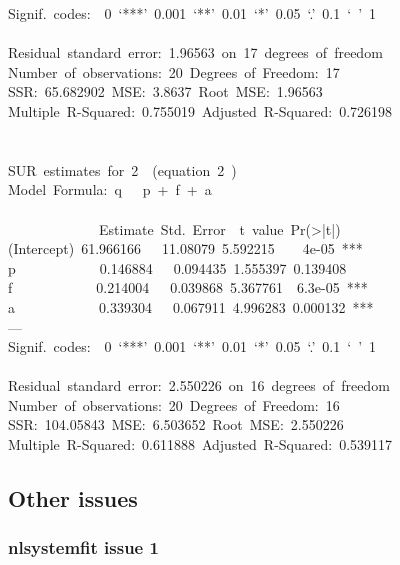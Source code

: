 \documentclass[article]{jss}
\begin{document}
{Signif.~codes:~~0~`***'~0.001~`**'~0.01~`*'~0.05~`.'~0.1~`~'~1~\\
~\\
Residual~standard~error:~1.96563~on~17~degrees~of~freedom~\\
Number~of~observations:~20~Degrees~of~Freedom:~17~\\
SSR:~65.682902~MSE:~3.8637~Root~MSE:~1.96563~\\
Multiple~R-Squared:~0.755019~Adjusted~R-Squared:~0.726198~\\
~\\
~\\
SUR~estimates~for~2~~(equation~2~)~\\
Model~Formula:~q~~~p~+~f~+~a\\
\\
\mbox{}~~~~~~~~~~~~~Estimate~Std.~Error~~t~value~Pr(>|t|)~\\
(Intercept)~61.966166~~~11.08079~5.592215~~~~4e-05~***~\\
p~~~~~~~~~~~~0.146884~~~0.094435~1.555397~0.139408~\\
f~~~~~~~~~~~~0.214004~~~0.039868~5.367761~~6.3e-05~***~\\
a~~~~~~~~~~~~0.339304~~~0.067911~4.996283~0.000132~***~\\
---~\\
Signif.~codes:~~0~`***'~0.001~`**'~0.01~`*'~0.05~`.'~0.1~`~'~1~\\
~\\
Residual~standard~error:~2.550226~on~16~degrees~of~freedom~\\
Number~of~observations:~20~Degrees~of~Freedom:~16~\\
SSR:~104.05843~MSE:~6.503652~Root~MSE:~2.550226~\\
Multiple~R-Squared:~0.611888~Adjusted~R-Squared:~0.539117~\\
}



\subsection{Other issues}


\subsubsection{nlsystemfit issue 1}
\end{document}
